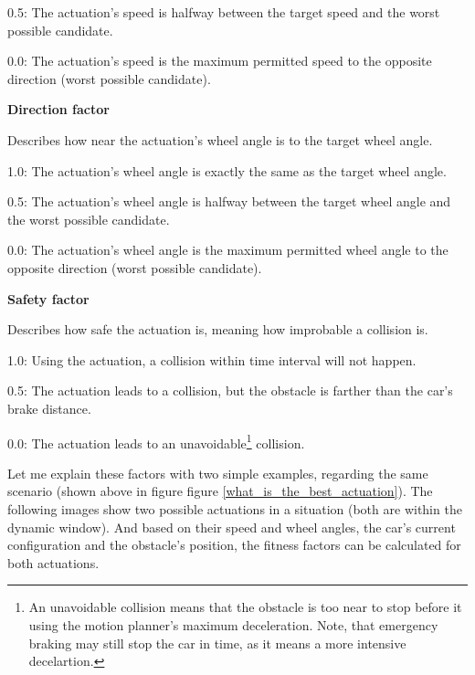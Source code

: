 0.5: The actuation's speed is halfway between the target speed and the worst possible candidate.

0.0: The actuation's speed is the maximum permitted speed to the opposite direction (worst possible candidate).

\textbf{Direction factor}

Describes how near the actuation's wheel angle is to the target wheel angle.

1.0: The actuation's wheel angle is exactly the same as the target wheel angle.

0.5: The actuation's wheel angle is halfway between the target wheel angle and the worst possible candidate.

0.0: The actuation's wheel angle is the maximum permitted wheel angle to the opposite direction (worst possible candidate).

\textbf{Safety factor}

Describes how safe the actuation is, meaning how improbable a collision is.

1.0: Using the actuation, a collision within time interval will not happen.

0.5: The actuation leads to a collision, but the obstacle is farther than the car's brake distance.

0.0: The actuation leads to an unavoidable\footnote{An unavoidable collision means that the obstacle is too near to stop before it using the motion planner's maximum deceleration. Note, that emergency braking may still stop the car in time, as it means a more intensive decelartion.} collision.

Let me explain these factors with two simple examples, regarding the same scenario (shown above in figure figure \ref{what_is_the_best_actuation}).
The following images show two possible actuations in a situation (both are within the dynamic window). And based on their speed and wheel angles, the car's current configuration and the obstacle's position, the fitness factors can be calculated for both actuations.

